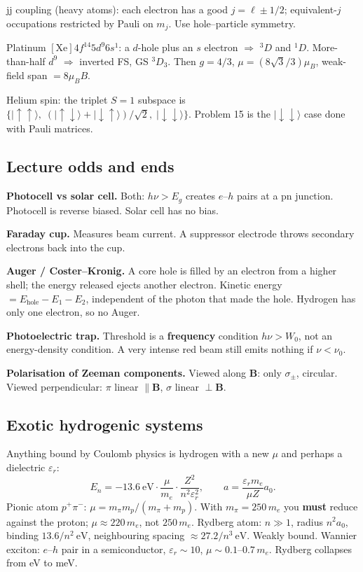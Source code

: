 \documentclass[11pt,a4paper]{article}
\begin{document}
jj coupling (heavy atoms): each electron has a good \(j=\ell\pm 1/2\); equivalent-\(j\) occupations restricted by Pauli on \(m_j\). Use hole--particle symmetry.

Platinum \([\mathrm{Xe}]4f^{14}5d^9 6s^1\): a \(d\)-hole plus an \(s\) electron \(\Rightarrow\) \({}^3D\) and \({}^1D\). More-than-half \(d^9\) \(\Rightarrow\) inverted FS, GS \({}^3D_3\). Then \(g=4/3\), \(\mu=(8\sqrt{3}/3)\mu_B\), weak-field span \(=8\mu_B B\).

Helium spin: the triplet \(S=1\) subspace is \(\{\lvert\uparrow\uparrow\rangle,\;(\lvert\uparrow\downarrow\rangle+\lvert\downarrow\uparrow\rangle)/\sqrt{2},\;\lvert\downarrow\downarrow\rangle\}\). Problem 15 is the \(\lvert\downarrow\downarrow\rangle\) case done with Pauli matrices.

\subsection{Lecture odds and ends}
\textbf{Photocell vs solar cell.} Both: \(h\nu>E_g\) creates \(e\)--\(h\) pairs at a pn junction. Photocell is reverse biased. Solar cell has no bias.

\textbf{Faraday cup.} Measures beam current. A suppressor electrode throws secondary electrons back into the cup.

\textbf{Auger / Coster--Kronig.} A core hole is filled by an electron from a higher shell; the energy released ejects another electron. Kinetic energy \(= E_{\mathrm{hole}}-E_1-E_2\), independent of the photon that made the hole. Hydrogen has only one electron, so no Auger.

\textbf{Photoelectric trap.} Threshold is a \textbf{frequency} condition \(h\nu>W_0\), not an energy-density condition. A very intense red beam still emits nothing if \(\nu<\nu_0\).

\textbf{Polarisation of Zeeman components.} Viewed along \(\mathbf{B}\): only \(\sigma_\pm\), circular. Viewed perpendicular: \(\pi\) linear \(\parallel\mathbf{B}\), \(\sigma\) linear \(\perp\mathbf{B}\).

\subsection{Exotic hydrogenic systems}
Anything bound by Coulomb physics is hydrogen with a new \(\mu\) and perhaps a dielectric \(\varepsilon_r\):
\[
E_n=-13.6~\mathrm{eV}\cdot\frac{\mu}{m_e}\cdot\frac{Z^2}{n^2\varepsilon_r^2},\qquad
a=\frac{\varepsilon_r m_e}{\mu Z}a_0.
\]
Pionic atom \(p^+\pi^-\): \(\mu=m_\pi m_p/(m_\pi+m_p)\). With \(m_\pi=250\,m_e\) you \textbf{must} reduce against the proton; \(\mu\approx 220\,m_e\), not \(250\,m_e\).
Rydberg atom: \(n\gg 1\), radius \(n^2 a_0\), binding \(13.6/n^2~\mathrm{eV}\), neighbouring spacing \(\approx 27.2/n^3~\mathrm{eV}\). Weakly bound.
Wannier exciton: \(e\)--\(h\) pair in a semiconductor, \(\varepsilon_r\sim 10\), \(\mu\sim 0.1\)--\(0.7\,m_e\). Rydberg collapses from eV to meV.
\end{document}

